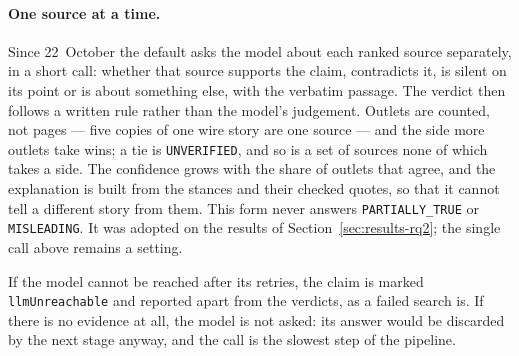 \paragraph{One source at a time.} Since 22~October the default asks
the model about each ranked source separately, in a short call: whether
that source supports the claim, contradicts it, is silent on its point
or is about something else, with the verbatim passage. The verdict then
follows a written rule rather than the model's judgement. Outlets are
counted, not pages --- five copies of one wire story are one source ---
and the side more outlets take wins; a tie is \texttt{UNVERIFIED}, and
so is a set of sources none of which takes a side. The confidence grows
with the share of outlets that agree, and the explanation is built from
the stances and their checked quotes, so that it cannot tell a different
story from them. This form never answers \texttt{PARTIALLY\_TRUE} or
\texttt{MISLEADING}. It was adopted on the results of
Section~\ref{sec:results-rq2}; the single call above remains a setting.

If the model cannot be reached after its retries, the claim is marked
\texttt{llmUnreachable} and reported apart from the verdicts, as a
failed search is. If there is no evidence at all, the model is not
asked: its answer would be discarded by the next stage anyway, and the
call is the slowest step of the pipeline.
